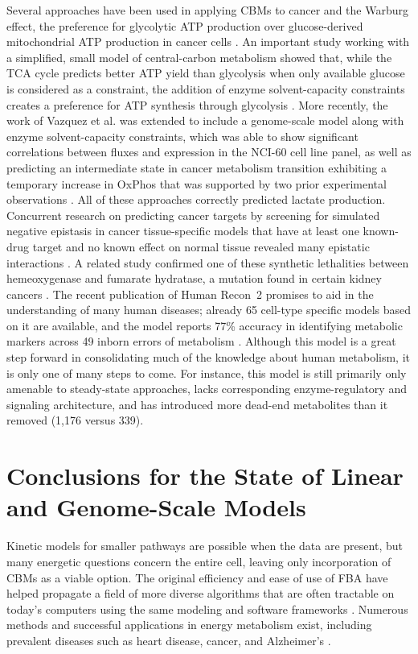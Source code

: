 \documentclass[phd,tocprelim]{cornell}
\begin{document}
Several approaches have been used in applying CBMs to cancer and the
Warburg effect, the preference for glycolytic ATP production over
glucose-derived mitochondrial ATP production in cancer cells 
\citep{Resendis-Antonio2010a, Shlomi2011, Vazquez2011}. An
important study working with a simplified, small model of
central-carbon metabolism showed that, while the TCA cycle predicts
better ATP yield than glycolysis when only available glucose is
considered as a constraint, the addition of enzyme solvent-capacity
constraints creates a preference for ATP synthesis through
glycolysis \citep{Vazquez2011}. More recently, the work of Vazquez et al. was extended
to include a genome-scale model along with enzyme solvent-capacity
constraints, which was able to show significant correlations between
fluxes and expression in the NCI-60 cell line panel, as well as
predicting an intermediate state in cancer metabolism transition
exhibiting a temporary increase in OxPhos that was supported by two
prior experimental observations \citep{Shlomi2011}. All of these
approaches correctly predicted lactate production. Concurrent research
on predicting cancer targets by screening for simulated negative
epistasis in cancer tissue-specific models that have at least one
known-drug target and no known effect on normal tissue revealed many
epistatic interactions \citep{Folger2011}. A related study confirmed
one of these synthetic lethalities between hemeoxygenase and fumarate
hydratase, a mutation found in certain kidney cancers
\citep{Frezza2011}. The recent publication of Human Recon~2 promises
to aid in the understanding of many human diseases; already 65
cell-type specific models based on it are available, and the model
reports 77\% accuracy in identifying metabolic markers across 49
inborn errors of metabolism \citep{Thiele2013}. Although this model is
a great step forward in consolidating much of the knowledge about human
metabolism, it is only one of many steps to come. For instance, this
model is still primarily only amenable to steady-state approaches,
lacks corresponding enzyme-regulatory and signaling architecture, and
has introduced more dead-end metabolites than it removed (1,176 versus
339). 

\section{Conclusions for the State of Linear and Genome-Scale Models}
Kinetic models for smaller pathways are possible when the data are
present, but many energetic questions concern the entire cell, leaving
only incorporation of CBMs as a viable option. The original efficiency
and ease of use of FBA have helped propagate a field of more diverse
algorithms that are often tractable on today’s computers using the
same modeling and software frameworks \citep{Gianchandani2009,
Lewis2012_sb2013}.  Numerous methods and successful applications in
energy metabolism exist, including prevalent diseases such as heart
disease, cancer, and Alzheimer’s \citep{Sangar2012}.
\end{document}

